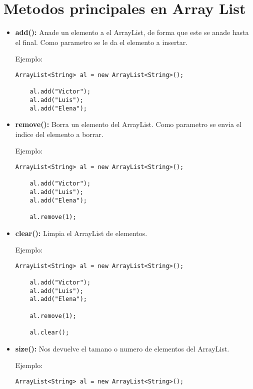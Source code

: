 \documentclass[12pt, letterpaper]{article} %
\begin{document}
\section*{Metodos principales en Array List}
\begin{itemize}
    \item \textbf{add():} Anade un elemento a el ArrayList, de forma que este se anade hasta el final. Como parametro se le da el elemento a insertar.
    
    Ejemplo:
    \lstset{language = Java, breaklines=true, basicstyle=\footnotesize}
    \begin{lstlisting}[frame=single]
    ArrayList<String> al = new ArrayList<String>();
    
    al.add("Victor");
    al.add("Luis");
    al.add("Elena");
    \end{lstlisting}
    
    \item \textbf{remove():} Borra un elemento del ArrayList. Como parametro se envia el indice del elemento a borrar.
    
    Ejemplo:
    \lstset{language = Java, breaklines=true, basicstyle=\footnotesize}
    \begin{lstlisting}[frame=single]
    ArrayList<String> al = new ArrayList<String>();

    al.add("Victor");    
    al.add("Luis");    
    al.add("Elena");
    
    al.remove(1);
    \end{lstlisting}
    
    \item \textbf{clear():} Limpia el ArrayList de elementos.
    
    Ejemplo:
    \lstset{language = Java, breaklines=true, basicstyle=\footnotesize}
    \begin{lstlisting}[frame=single]
    ArrayList<String> al = new ArrayList<String>();

    al.add("Victor");
    al.add("Luis");
    al.add("Elena");
    
    al.remove(1);

    al.clear();
    \end{lstlisting}
    
    \item \textbf{size():} Nos devuelve el tamano o numero de elementos del ArrayList.
    
    Ejemplo:
    \lstset{language = Java, breaklines=true, basicstyle=\footnotesize}
    \begin{lstlisting}[frame=single]
    ArrayList<String> al = new ArrayList<String>();
    

\end{lstlisting}
\end{itemize}
\end{document}
